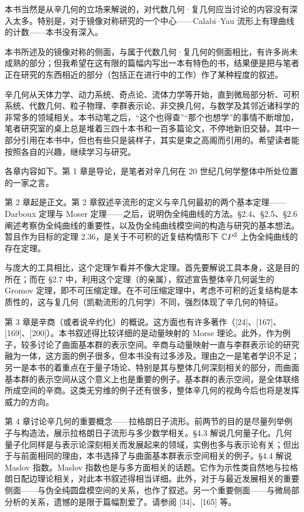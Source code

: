 本书当然是从辛几何的立场来解说的，对代数几何·复几何应当讨论的内容没有深入太多。特别是，对于镜像对称研究的一个中心——Calabi–Yau 流形上有理曲线的计数——本书没有深入。

本书所述及的镜像对称的侧面，与属于代数几何·复几何的侧面相比，有许多尚未成熟的部分；但我希望在这有限的篇幅内写出一本有特色的书，结果便是把与笔者正在研究的东西相近的部分（包括正在进行中的工作）作了某种程度的叙述。

辛几何从天体力学、动力系统、奇点论、流体力学等开始，直到微局部分析、可积系统、代数几何、粒子物理、李群表示论、非交换几何，与数学及其邻近诸科学的非常多的领域相关。本书动笔之后，“这个也得查”“那个也想学”的事情不断增加，笔者研究室的桌上总是堆着三四十本书和一百多篇论文，不停地新旧交替。其中一部分引用在本书中，但也有些只是装样子，其实是束之高阁而引用的。希望读者能按照各自的兴趣，继续学习与研究。

各章内容如下。第 1 章是导论，是笔者对辛几何在 20 世纪几何学整体中所处位置的一家之言。

第 2 章起是正文。第 2 章叙述辛流形的定义与辛几何最初的两个基本定理——Darboux 定理与 Moser 定理——之后，说明伪全纯曲线的方法。§2.4、§2.5、§2.6 阐述考察伪全纯曲线的重要性，以及伪全纯曲线模空间的构造与研究的基本想法。暂且作为目标的定理 2.36，是关于不可积的近复结构情形下 $\mathbb{C}P^2$ 上伪全纯曲线的存在定理。

与庞大的工具相比，这个定理乍看并不像大定理。首先要解说工具本身，这是目的所在；而在 §2.7 中，利用这个定理（的亲属），叙述宣告整体辛几何诞生的 Gromov 定理，即不可压缩定理。在不可压缩定理中，考虑不可积的近复结构是本质性的，这与复几何（凯勒流形的几何学）不同，强烈体现了辛几何的特征。

第 3 章是辛商（或者说辛约化）的概说。这方面也有许多著作（[24]、[167]、[169]、[200]）。本书叙述得比较详细的是动量映射的 Morse 理论。此外，作为例子，较多讨论了曲面基本群的表示空间。辛商与动量映射一直与李群表示论的研究融为一体，这方面的例子很多，但本书没有过多涉及。理由之一是笔者学识不足；另一是本书的着重点在于量子场论、特别是其与整体几何深刻相关的部分，而曲面基本群的表示空间从这个意义上也是重要的例子。基本群的表示空间，是全体联络所成空间的辛商。这类无穷维的例子还有很多，整体辛几何的视角今后也将是发挥威力的方向。

第 4 章讨论辛几何的重要概念——拉格朗日子流形。前两节的目的是尽量列举例子与构造法，展示拉格朗日子流形与多少数学相关。§4.3 解说几何量子化。几何量子化同样是与表示论深刻相关而发展起来的领域，实例也多与表示论有关；但出于与前面相同的理由，本书选择了与曲面基本群表示空间相关的例子。§4.4 解说 Maslov 指数。Maslov 指数也是与多方面相关的话题。它作为示性类自然地与拉格朗日配边理论相关，对此本书叙述得相当详细。此外，对于与最近发展相关的重要侧面——与伪全纯圆盘模空间的关系，也作了叙述。另一个重要侧面——与微局部分析的关系，遗憾的是限于篇幅割爱了。请参阅 [34]、[165] 等。

